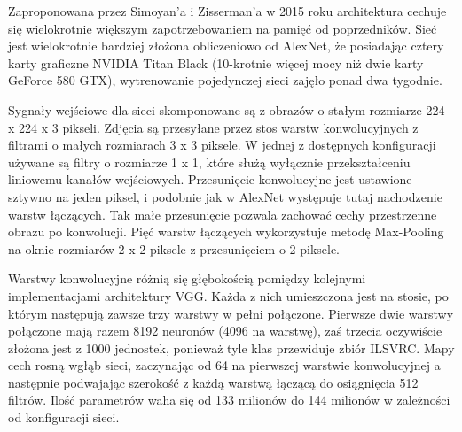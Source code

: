 \documentclass[12pt,a4paper,twoside,titlepage,openright]{book}
\begin{document}
\begin{itemize}
\begin{itemize}
Zaproponowana przez Simoyan'a i Zisserman'a w 2015 roku architektura cechuje się wielokrotnie większym zapotrzebowaniem na pamięć od poprzedników. %
Sieć jest wielokrotnie bardziej złożona obliczeniowo od AlexNet, że posiadając cztery karty graficzne NVIDIA Titan Black (10-krotnie więcej mocy niż dwie karty GeForce 580 GTX), wytrenowanie pojedynczej sieci zajęło ponad dwa tygodnie.

Sygnały wejściowe dla sieci skomponowane są z obrazów o stałym rozmiarze 224 x 224 x 3 pikseli. Zdjęcia są przesyłane przez stos warstw konwolucyjnych z filtrami o małych rozmiarach 3 x 3 piksele. W jednej z dostępnych konfiguracji używane są filtry o rozmiarze 1 x 1, które służą wyłącznie przekształceniu liniowemu kanałów wejściowych. Przesunięcie konwolucyjne jest ustawione sztywno na jeden piksel, i podobnie jak w AlexNet występuje tutaj nachodzenie warstw łączących. Tak małe przesunięcie pozwala zachować cechy przestrzenne obrazu po konwolucji. Pięć warstw łączących wykorzystuje metodę Max-Pooling na oknie rozmiarów 2 x 2 piksele z przesunięciem o 2 piksele.

Warstwy konwolucyjne różnią się głębokością pomiędzy kolejnymi implementacjami architektury VGG. Każda z nich umieszczona jest na stosie, po którym następują zawsze trzy warstwy w pełni połączone. Pierwsze dwie warstwy połączone mają razem 8192 neuronów (4096 na warstwę), zaś trzecia oczywiście złożona jest z 1000 jednostek, ponieważ tyle klas przewiduje zbiór ILSVRC. Mapy cech rosną wgłąb sieci, zaczynając od 64 na pierwszej warstwie konwolucyjnej a następnie podwajając szerokość z każdą warstwą łączącą do osiągnięcia 512 filtrów. Ilość parametrów waha się od 133 milionów do 144 milionów w zależności od konfiguracji sieci.


\end{itemize}
\end{itemize}
\end{document}
